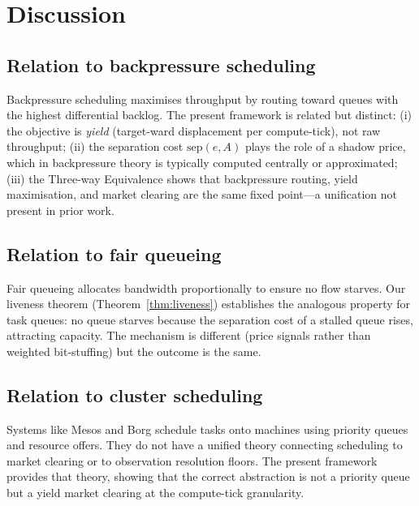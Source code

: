 \documentclass[11pt,twocolumn,a4paper]{article}
\theoremstyle{plain}
\theoremstyle{definition}
\theoremstyle{remark}
\newcommand{\sep}{\mathrm{sep}}
\begin{document}
\section{Discussion}
\label{sec:discussion}

\subsection{Relation to backpressure scheduling}

Backpressure scheduling \cite{tassiulas1992,neely2010} maximises throughput by routing toward queues with the highest differential backlog. The present framework is related but distinct: (i) the objective is \emph{yield} (target-ward displacement per compute-tick), not raw throughput; (ii) the separation cost $\sep(e, A)$ plays the role of a shadow price, which in backpressure theory is typically computed centrally or approximated; (iii) the Three-way Equivalence shows that backpressure routing, yield maximisation, and market clearing are the same fixed point---a unification not present in prior work.

\subsection{Relation to fair queueing}

Fair queueing \cite{demers1990} allocates bandwidth proportionally to ensure no flow starves. Our liveness theorem (Theorem~\ref{thm:liveness}) establishes the analogous property for task queues: no queue starves because the separation cost of a stalled queue rises, attracting capacity. The mechanism is different (price signals rather than weighted bit-stuffing) but the outcome is the same.

\subsection{Relation to cluster scheduling}

Systems like Mesos \cite{hindman2011} and Borg \cite{verma2015} schedule tasks onto machines using priority queues and resource offers. They do not have a unified theory connecting scheduling to market clearing or to observation resolution floors. The present framework provides that theory, showing that the correct abstraction is not a priority queue but a yield market clearing at the compute-tick granularity.
\end{document}
